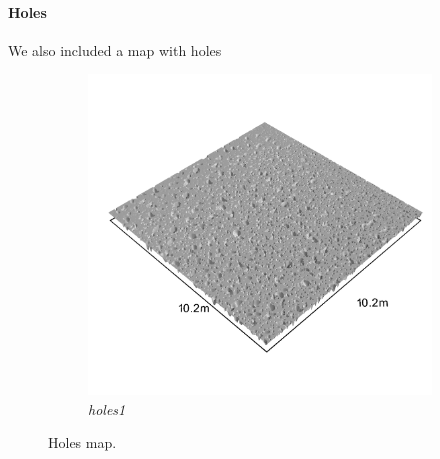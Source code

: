 \documentclass[../document.tex]{subfiles}
\begin{document}
\paragraph{Holes} We also included a map with holes
\begin{figure}[H]
    \centering
        \begin{subfigure}[b]{0.23\textwidth}
            \includegraphics[width=\textwidth]{../img/hm3d_borders/holes1.png}
            \caption{\emph{holes1}}
        \end{subfigure}
\caption{Holes map.}
\end{figure}
\end{document}
